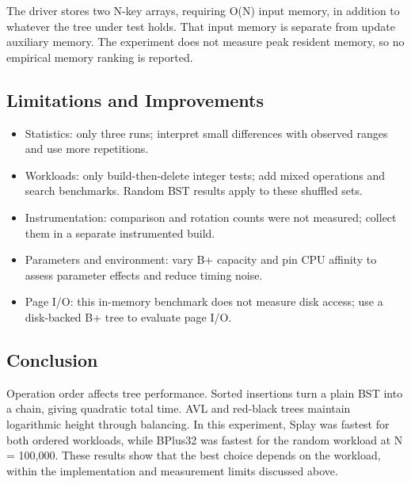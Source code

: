 The driver stores two N-key arrays, requiring O(N) input memory, in addition to whatever the tree under test holds. That input memory is separate from update auxiliary memory. The experiment does not measure peak resident memory, so no empirical memory ranking is reported.

\subsection{Limitations and Improvements}

\begin{itemize}
  \item Statistics: only three runs; interpret small differences with observed ranges and use more repetitions.
  \item Workloads: only build-then-delete integer tests; add mixed operations and search benchmarks. Random BST results apply to these shuffled sets.
  \item Instrumentation: comparison and rotation counts were not measured; collect them in a separate instrumented build.
  \item Parameters and environment: vary B+ capacity and pin CPU affinity to assess parameter effects and reduce timing noise.
  \item Page I/\allowbreak{}O: this in-memory benchmark does not measure disk access; use a disk-backed B+ tree to evaluate page I/\allowbreak{}O.
\end{itemize}

\subsection{Conclusion}

Operation order affects tree performance. Sorted insertions turn a plain BST into a chain, giving quadratic total time. AVL and red-black trees maintain logarithmic height through balancing. In this experiment, Splay was fastest for both ordered workloads, while BPlus32 was fastest for the random workload at N = 100,000. These results show that the best choice depends on the workload, within the implementation and measurement limits discussed above.
